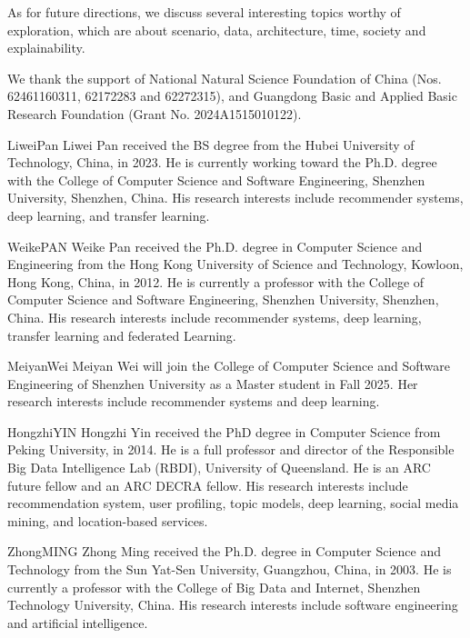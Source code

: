 \documentclass[review]{fcs}
\begin{document}
	As for future directions, we discuss several interesting topics worthy of exploration, which are about scenario, data, architecture, time, society and explainability.
	\begin{acknowledgement}
	We thank the support of National Natural Science Foundation of China (Nos. 62461160311, 62172283 and 62272315), and Guangdong Basic and Applied Basic Research Foundation (Grant No. 2024A1515010122).
	\end{acknowledgement}
	
	
	\begin{biography}{LiweiPan}
		Liwei Pan received the BS degree from the Hubei University of Technology, China, in 2023. He is currently working toward the Ph.D. degree with the College of Computer Science and Software Engineering, Shenzhen University, Shenzhen, China. His research interests include recommender systems, deep learning, and transfer learning. 
	\end{biography}
	\begin{biography}{WeikePAN}
		Weike Pan received the Ph.D. degree in Computer Science and Engineering from the Hong Kong University of Science and Technology, Kowloon, Hong Kong, China, in 2012. He is currently a professor with the College of Computer Science and Software Engineering, Shenzhen University, Shenzhen, China. His research interests include recommender systems, deep learning, transfer learning and federated Learning. 
	\end{biography}
	\begin{biography}{MeiyanWei}
		Meiyan Wei will join the College of Computer Science and Software Engineering of Shenzhen University as a Master student in Fall 2025.  Her research interests include recommender systems and deep learning.
	\end{biography}
	\begin{biography}{HongzhiYIN}
		Hongzhi Yin received the PhD degree in Computer Science from Peking University, in 2014. He is a full professor and director of the Responsible Big Data Intelligence Lab (RBDI), University of Queensland. He is an ARC future fellow and an ARC DECRA fellow. His research interests include recommendation system, user profiling, topic models, deep learning, social media mining, and location-based services.
	\end{biography}
	\begin{biography}{ZhongMING}
		Zhong Ming received the Ph.D. degree in Computer Science and Technology from the Sun Yat-Sen University, Guangzhou, China, in 2003. He is currently a professor with the College of Big Data and Internet, Shenzhen Technology University, China. His research interests include software engineering and artificial intelligence. 
	\end{biography}
\end{document}
